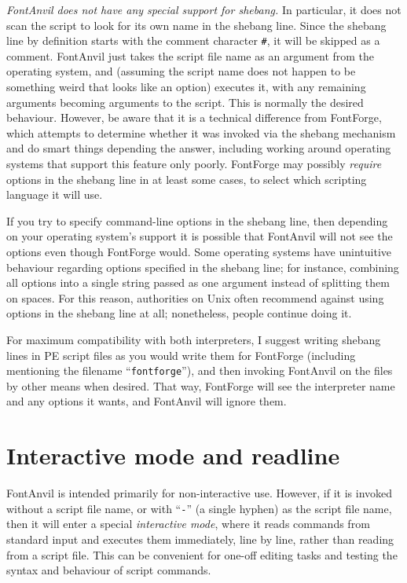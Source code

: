 \documentclass[11pt]{report}
\begin{document}
\emph{FontAnvil does not have any special support for shebang.}  In
particular, it does not scan the script to look for its own name in the
shebang line.  Since the shebang line by definition starts with the comment
character \texttt{\#}, it will be skipped as a comment.  FontAnvil just
takes the script file name as an argument from the operating system, and
(assuming the script name does not happen to be something weird that looks
like an option) executes it, with any remaining arguments becoming arguments
to the script.  This is normally the desired behaviour.  However, be aware
that it is a technical difference from FontForge, which attempts to
determine whether it was invoked via the shebang mechanism and do smart
things depending the answer, including working around operating systems that
support this feature only poorly.  FontForge may possibly \emph{require}
options in the shebang line in at least some cases, to select which
scripting language it will use.

If you try to specify command-line options in the shebang line, then
depending on your operating system's support it is possible that FontAnvil
will not see the options even though FontForge would.  Some operating
systems have unintuitive behaviour regarding options specified in the
shebang line; for instance, combining all options into a single string
passed as one argument instead of splitting them on spaces.  For this
reason, authorities on Unix often recommend against using options in the
shebang line at all; nonetheless, people continue doing it.

For maximum compatibility with both interpreters, I suggest writing shebang
lines in PE script files as you would write them for FontForge (including
mentioning the filename ``\texttt{fontforge}''), and then invoking FontAnvil
on the files by other means when desired.  That way, FontForge will see the
interpreter name and any options it wants, and FontAnvil will ignore them.

\section{Interactive mode and readline}

FontAnvil is intended primarily for non-interactive use.  However, if it is
invoked without a script file name, or with ``\texttt{-}'' (a single hyphen)
as the script file name, then it will enter a special \emph{interactive
mode}, where it reads commands from standard input and executes them
immediately, line by line, rather than reading from a script file.  This can
be convenient for one-off editing tasks and testing the syntax and behaviour
of script commands.
\end{document}
